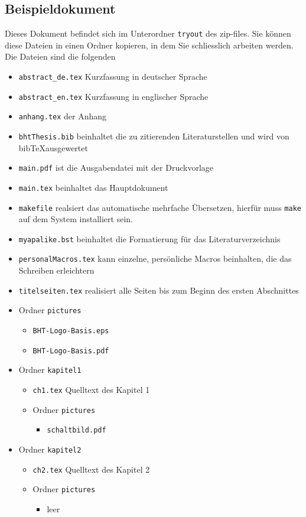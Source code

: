 \subsection*{Beispieldokument}
Dieses  Dokument befindet sich  im Unterordner  \texttt{tryout} des  zip-files. Sie
können diese  Dateien in  einen Ordner kopieren,  in dem Sie  schliesslich arbeiten
werden. Die Dateien sind die folgenden

\begin{itemize}
\item \texttt{abstract\_de.tex} Kurzfassung in deutscher Sprache
\item \texttt{abstract\_en.tex} Kurzfassung in englischer Sprache
\item \texttt{anhang.tex} der Anhang
\item \texttt{bhtThesis.bib} beinhaltet die zu zitierenden Literaturstellen und
  wird von bib\TeX ausgewertet 
\item \texttt{main.pdf} ist die Ausgabendatei mit der Druckvorlage
\item \texttt{main.tex} beinhaltet das Hauptdokument
\item \texttt{makefile} realsiert das automatische mehrfache Übersetzen, hierfür
  muss \texttt{make} auf dem System installiert sein.
\item \texttt{myapalike.bst} beinhaltet die Formatierung für das
  Literaturverzeichnis 
\item \texttt{personalMacros.tex} kann einzelne, persönliche Macros beinhalten, die
  das Schreiben erleichtern
\item \texttt{titelseiten.tex} realisiert alle Seiten bis zum Beginn des ersten
  Abschnittes  

\item Ordner \texttt{pictures}
  \begin{itemize}
  \item \texttt{BHT-Logo-Basis.eps}
  \item \texttt{BHT-Logo-Basis.pdf}
  \end{itemize}

\item Ordner \texttt{kapitel1}
  \begin{itemize}
  \item \texttt{ch1.tex} Quelltext des Kapitel 1
  \item Ordner \texttt{pictures}
    \begin{itemize}
    \item \texttt{schaltbild.pdf}
    \end{itemize}
  \end{itemize}
  
\item Ordner \texttt{kapitel2}
  \begin{itemize}
  \item \texttt{ch2.tex} Quelltext des Kapitel 2
  \item Ordner \texttt{pictures}
    \begin{itemize}
    \item leer
    \end{itemize}
  \end{itemize}  
\end{itemize}

